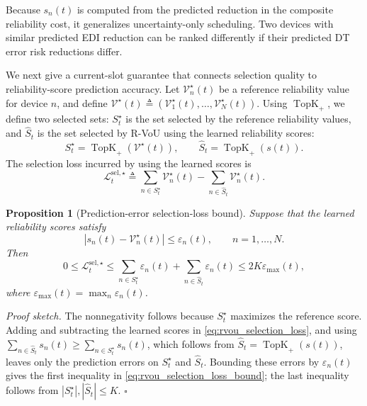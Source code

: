 \documentclass[conference]{IEEEtran}
\newtheorem{proposition}[theorem]{Proposition}
\begin{document}
Because \(s_n(t)\) is computed from the predicted reduction in the composite
reliability cost, it generalizes uncertainty-only scheduling. Two devices with
similar predicted EDI reduction can be ranked differently if their predicted
DT error risk reductions differ.

We next give a current-slot guarantee that connects selection quality to
reliability-score prediction accuracy. Let \(\mathcal V_n^\star(t)\) be a reference reliability value for device
\(n\), and define
\(\mathcal V^\star(t)\triangleq(\mathcal V_1^\star(t),\ldots,
\mathcal V_N^\star(t))\). Using
\(\operatorname{TopK}_{+}\), we define two selected sets: \(S_t^\star\) is
the set selected by the reference reliability values, and \(\widehat S_t\)
is the set selected by \mbox{R-VoU} using the learned reliability scores:
\vspace{-1.6mm}
\[
S_t^\star
=
\operatorname{TopK}_{+}(\mathcal V^\star(t)),
\qquad
\widehat S_t
=
\operatorname{TopK}_{+}(s(t)).
\]
\noindent The selection loss incurred by using the learned scores is
\begin{equation}
\label{eq:rvou_selection_loss}
\mathcal L_t^{\mathrm{sel},\star}
\triangleq
\sum_{n\in S_t^\star}\mathcal V_n^\star(t)
-
\sum_{n\in\widehat S_t}\mathcal V_n^\star(t).
\end{equation}
\vspace{-4.9mm}
\begin{proposition}[Prediction-error selection-loss bound]
\label{prop:rvou_selection_loss}
Suppose that the learned reliability scores satisfy
\vspace{-1mm}
\[
\left|
s_n(t)-\mathcal V_n^\star(t)
\right|
\le
\varepsilon_n(t),
\qquad n=1,\ldots,N .
\]
Then
\begin{equation}
\label{eq:rvou_selection_loss_bound}
0
\le
\mathcal L_t^{\mathrm{sel},\star}
\le
\sum_{n\in S_t^\star}\varepsilon_n(t)
+
\sum_{n\in\widehat S_t}\varepsilon_n(t)
\le
2K\varepsilon_{\max}(t),
\end{equation}
where \(\varepsilon_{\max}(t)=\max_n\varepsilon_n(t)\).
\end{proposition}
\vspace{-2mm}
\noindent\emph{Proof sketch.}
The nonnegativity follows because \(S_t^\star\) maximizes the reference
score. Adding and subtracting the learned scores in
\eqref{eq:rvou_selection_loss}, and using
\(\sum_{n\in\widehat S_t}s_n(t)\ge
\sum_{n\in S_t^\star}s_n(t)\), which follows from
\(\widehat S_t=\operatorname{TopK}_{+}(s(t))\), leaves only the prediction
errors on \(S_t^\star\) and \(\widehat S_t\). Bounding these errors by
\(\varepsilon_n(t)\) gives the first inequality in
\eqref{eq:rvou_selection_loss_bound}; the last inequality follows from
\(|S_t^\star|,|\widehat S_t|\le K\). \(\square\)
\end{document}
